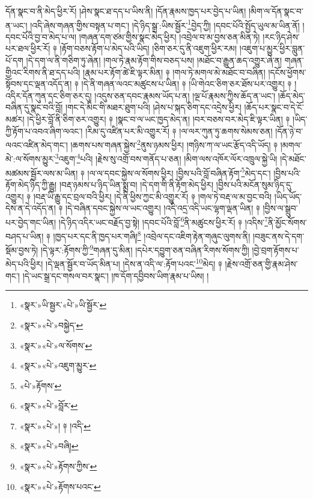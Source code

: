 དོན་སྣང་བ་ནི་མེད་ཕྱིར་རོ། །ཤེས་སྣང་ཐ་དད་པ་ཡིས་ནི། །དོན་རྣམས་ཁྱད་པར་བྱེད་པ་ཡིན། །མིག་ལ་དོན་སྣང་བ་ན་ཡང་། །འདི་ཞེས་གཞན་གྱིས་བསྟན་པ་གང་། །དེ་ཉིད་སྒྲ་:ཡིས་སྦྱོར་\footnote{«སྣར་»ཡི་སྦྱར་«པེ་»ཡི་སྦྱོར་}བྱེད་ཀྱི། །དབང་པོའི་སྤྱོད་ཡུལ་མ་ཡིན་ནོ། །དབང་པོའི་བྱ་བ་མེད་པ་ལ། །གཞན་དག་ཙམ་གྱིས་སྣང་མེད་ཕྱིར། །འབྲེལ་བ་མ་བྱས་ཅན་མིན་ཏེ། །རང་ཉིད་ཤེས་པར་ཐལ་ཕྱིར་རོ། ༈ །རྟོག་བཅས་རྟོག་པ་མེད་པའི་ཡིད། །ཅིག་ཅར་དུ་ནི་འཇུག་ཕྱིར་རམ། །འཇུག་པ་མྱུར་ཕྱིར་བླུན་པོ་དག །དེ་དག་ལ་ནི་གཅིག་ཏུ་ཞེན། །གལ་ཏེ་རྣམ་རྟོག་གིས་བཅད་པས། །མཐོང་བ་རྒྱུན་ཆད་འགྱུར་ཞེ་ན། གཞན་གྱིའང་རིགས་ནི་ཐ་དད་པའི། །རྣམ་པར་རྟོག་ཚེ་ཇི་ལྟར་མིན། ༈ །གལ་ཏེ་མགལ་མེ་མཐོང་བ་བཞིན། །དངོས་ཕྱོགས་སྟོབས་དང་ལྡན་འདོད་ན། ༈ །དེ་ནི་གཞན་ལའང་མཚུངས་པ་ཡིན། ༈ །ཡི་གེའང་ཅིག་ཅར་ཐོས་པར་འགྱུར། ༈ །འདིར་དོན་ཀུན་དང་ཅིག་ཅར་དུ། །འདུས་ཅན་དབང་རྣམས་ཡོད་པ་ན། །ལྔ་པོ་རྣམས་ཀྱིས་ཆོད་ན་ཡང་། །ཆོད་མེད་བཞིན་དུ་སྣང་བའི་བློ། །གང་དེ་མིང་གི་མཐར་ཐུག་པའི། །ཤེས་པ་སྐད་ཅིག་དང་འདྲེས་ཕྱིར། །ཆོད་པར་སྣང་བ་དེ་ངོ་མཚར། །དེ་ཕྱིར་བློ་ནི་ཅིག་ཅར་འགྱུར། ༈ །སྣང་བ་ལ་ཡང་ཁྱད་མེད་ན། །བར་བཅས་བར་མེད་ཇི་ལྟར་ཡིན། ༈ །ཡིད་ཀྱི་རྟོག་པ་འབའ་ཞིག་ལའང་། །རིམ་དུ་འཛིན་པར་མི་འགྱུར་རོ། ༈ །ལ་ལར་ཀུན་ཏུ་ཆགས་སེམས་ཅན། །དོན་ཉེ་བ་ལའང་འཛིན་མེད་གང་། །ཆགས་པས་གཞན་སྐྱེས་\footnote{«སྣར་»«པེ་»བསྐྱེད་}ནུས་ཉམས་ཕྱིར། །གཉིས་ཀ་ལ་ཡང་རྩོད་འདི་ཡོད། ༈ །མགལ་མེ་:ལ་སོགས་མྱུར་\footnote{«སྣར་»«པེ་»ལ་སོགས་}འཇུག་\footnote{«སྣར་»«པེ་»འཇུག་མྱུར་}པའི། །རྗེས་སུ་འགྲོ་བས་གནོད་པ་ཅན། །མིག་ལས་འཁོར་ལོར་འཁྲུལ་སྐྱེ་ཡི། །དེ་མཐོང་མཚམས་སྦྱོར་ལས་མ་ཡིན། ༈ །ལ་ལ་དབང་སྐྱེས་ལ་སོགས་ཕྱིར། །བྱིས་པའི་བློ་བཞིན་རྟོག་\footnote{«པེ་»རྟོགས་}མེད་དང་། །བྱིས་པའི་རྟོག་མེད་ཉིད་ཀྱི་རྒྱུ། །བརྡ་ཉམས་པ་ཉིད་ཡིན་སྨྲ་བ། །དེ་དག་གི་ནི་རྟོག་མེད་ཕྱིར། །བྱིས་པའི་མངོན་སུམ་ཉིད་དུ་འགྱུར། ༈ །བརྡ་ཡི་རྒྱུ་དང་བྲལ་བའི་ཕྱིར། །དེ་ནི་ཕྱིས་ཀྱང་མི་འགྱུར་རོ། ༈ །གལ་ཏེ་བརྡ་ལ་མ་བྱང་བའི། །ཡིད་ཡོད་དེས་ན་དེ་འདོད་ན། ༈ །དེ་བཞིན་དབང་སྐྱེས་ལ་ཡང་འགྱུར། །འདི་འདྲ་འདི་ཡང་ལྷག་ལྡན་ཡིན། ༈ །བྱིས་ལ་སྒྲུབ་པར་བྱེད་གང་ཡིན། །དེ་ཉིད་འདིར་ཡང་བརྗོད་བྱ་སྟེ། །དབང་པོའི་བློ་\footnote{«སྣར་»«པེ་»བློར་}ནི་མཚུངས་ཕྱིར་རོ། ༈ །འདིས་\footnote{«སྣར་»«པེ་»། ༈ །འདི་}ནི་མྱོང་སོགས་བཤད་པ་ཡིན། ༈ །ཁྱད་པར་དང་ནི་ཁྱད་པར་གཞི།\footnote{«སྣར་»«པེ་»བཞི།} །འབྲེལ་དང་འཇིག་རྟེན་གཞུང་ལུགས་ནི། །བཟུང་ནས་དེ་དག་སྡོམ་བྱས་ཏེ། །དེ་ལྟར་:རྟོགས་ཀྱི་\footnote{«སྣར་»«པེ་»རྟོགས་ཀྱིས་}གཞན་དུ་མིན། །དཔེར་དབྱུག་ཅན་བཞིན་རིགས་སོགས་ཀྱི། །བྱེ་བྲག་རྟོགས་པ་མེད་པའི་ཕྱིར། །དེ་ལྡན་སྦྱོར་བ་ཡོད་མིན་པ། །དེས་ན་འདི་ལ་:རྟོག་པའང་\footnote{«སྣར་»«པེ་»རྟོགས་པའང་}མེད། ༈ །རྗེས་འགྲོ་ཅན་གྱི་རྣམ་ཤེས་གང་། །དེ་ཡང་སྒྲ་དང་གསལ་བར་སྣང་། །ཁ་དོག་དབྱིབས་ཡིག་རྣམ་པ་ཡིས། །
